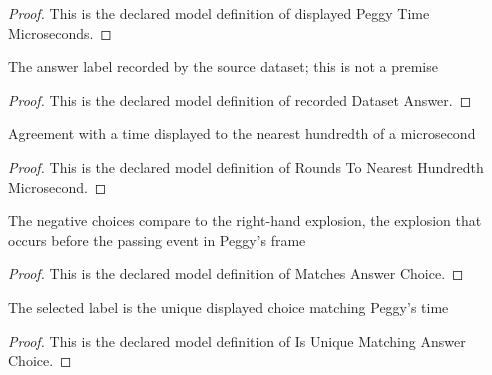 \begin{proof}
  This is the declared model definition of displayed Peggy Time Microseconds.
\end{proof}
\begin{definition}
  \label{def:physics:phyx-mini-0633:phyxminiproblems-problemphyxmini0633-recordeddatasetanswer}
  The answer label recorded by the source dataset; this is not a premise
\end{definition}
\begin{proof}
  This is the declared model definition of recorded Dataset Answer.
\end{proof}
\begin{definition}
  \label{def:physics:phyx-mini-0633:phyxminiproblems-problemphyxmini0633-roundstonearesthundredthmicrosecond}
  Agreement with a time displayed to the nearest hundredth of a microsecond
\end{definition}
\begin{proof}
  This is the declared model definition of Rounds To Nearest Hundredth Microsecond.
\end{proof}
\begin{definition}
  \label{def:physics:phyx-mini-0633:phyxminiproblems-problemphyxmini0633-matchesanswerchoice}
  The negative choices compare to the right-hand explosion, the explosion that occurs before the passing event in Peggy's frame
\end{definition}
\begin{proof}
  This is the declared model definition of Matches Answer Choice.
\end{proof}
\begin{definition}
  \label{def:physics:phyx-mini-0633:phyxminiproblems-problemphyxmini0633-isuniquematchinganswerchoice}
  The selected label is the unique displayed choice matching Peggy's time
\end{definition}
\begin{proof}
  This is the declared model definition of Is Unique Matching Answer Choice.
\end{proof}
